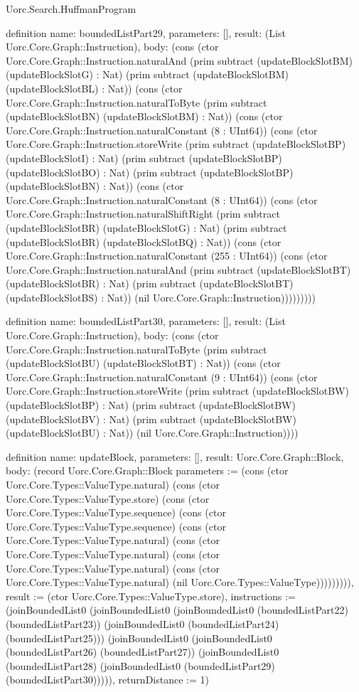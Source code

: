 \begin{lexlean}{Uorc.Search.HuffmanProgram}
\begin{semanticmodule}
definition{
  name: boundedListPart29,
  parameters: [],
  result: (List Uorc.Core.Graph::Instruction),
  body: (cons (ctor Uorc.Core.Graph::Instruction.naturalAnd (prim subtract (updateBlockSlotBM) (updateBlockSlotG) : Nat) (prim subtract (updateBlockSlotBM) (updateBlockSlotBL) : Nat)) (cons (ctor Uorc.Core.Graph::Instruction.naturalToByte (prim subtract (updateBlockSlotBN) (updateBlockSlotBM) : Nat)) (cons (ctor Uorc.Core.Graph::Instruction.naturalConstant (8 : UInt64)) (cons (ctor Uorc.Core.Graph::Instruction.storeWrite (prim subtract (updateBlockSlotBP) (updateBlockSlotI) : Nat) (prim subtract (updateBlockSlotBP) (updateBlockSlotBO) : Nat) (prim subtract (updateBlockSlotBP) (updateBlockSlotBN) : Nat)) (cons (ctor Uorc.Core.Graph::Instruction.naturalConstant (8 : UInt64)) (cons (ctor Uorc.Core.Graph::Instruction.naturalShiftRight (prim subtract (updateBlockSlotBR) (updateBlockSlotG) : Nat) (prim subtract (updateBlockSlotBR) (updateBlockSlotBQ) : Nat)) (cons (ctor Uorc.Core.Graph::Instruction.naturalConstant (255 : UInt64)) (cons (ctor Uorc.Core.Graph::Instruction.naturalAnd (prim subtract (updateBlockSlotBT) (updateBlockSlotBR) : Nat) (prim subtract (updateBlockSlotBT) (updateBlockSlotBS) : Nat)) (nil Uorc.Core.Graph::Instruction)))))))))
}

definition{
  name: boundedListPart30,
  parameters: [],
  result: (List Uorc.Core.Graph::Instruction),
  body: (cons (ctor Uorc.Core.Graph::Instruction.naturalToByte (prim subtract (updateBlockSlotBU) (updateBlockSlotBT) : Nat)) (cons (ctor Uorc.Core.Graph::Instruction.naturalConstant (9 : UInt64)) (cons (ctor Uorc.Core.Graph::Instruction.storeWrite (prim subtract (updateBlockSlotBW) (updateBlockSlotBP) : Nat) (prim subtract (updateBlockSlotBW) (updateBlockSlotBV) : Nat) (prim subtract (updateBlockSlotBW) (updateBlockSlotBU) : Nat)) (nil Uorc.Core.Graph::Instruction))))
}

definition{
  name: updateBlock,
  parameters: [],
  result: Uorc.Core.Graph::Block,
  body: (record Uorc.Core.Graph::Block {parameters := (cons (ctor Uorc.Core.Types::ValueType.natural) (cons (ctor Uorc.Core.Types::ValueType.store) (cons (ctor Uorc.Core.Types::ValueType.sequence) (cons (ctor Uorc.Core.Types::ValueType.sequence) (cons (ctor Uorc.Core.Types::ValueType.natural) (cons (ctor Uorc.Core.Types::ValueType.natural) (cons (ctor Uorc.Core.Types::ValueType.natural) (cons (ctor Uorc.Core.Types::ValueType.natural) (nil Uorc.Core.Types::ValueType))))))))), result := (ctor Uorc.Core.Types::ValueType.store), instructions := (joinBoundedList0 (joinBoundedList0 (joinBoundedList0 (boundedListPart22) (boundedListPart23)) (joinBoundedList0 (boundedListPart24) (boundedListPart25))) (joinBoundedList0 (joinBoundedList0 (boundedListPart26) (boundedListPart27)) (joinBoundedList0 (boundedListPart28) (joinBoundedList0 (boundedListPart29) (boundedListPart30))))), returnDistance := 1})
}


\end{semanticmodule}
\end{lexlean}
